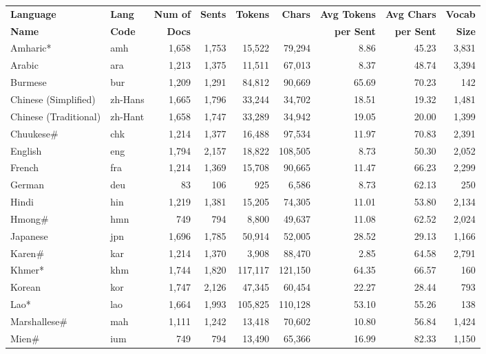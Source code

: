 \begin{table}[t]
\centering
\small
\setlength{\tabcolsep}{4pt}
\begin{tabular}{l l r r r r r r r}
\toprule
\textbf{Language} & \textbf{Lang} & \textbf{Num of} & \textbf{Sents} & \textbf{Tokens} & \textbf{Chars} & \textbf{Avg Tokens} & \textbf{Avg Chars} & \textbf{Vocab} \\
\textbf{Name} & \textbf{Code} & \textbf{Docs} &  &  &  & \textbf{per Sent} & \textbf{per Sent} & \textbf{Size} \\
\midrule
Amharic* & amh & 1,658 & 1,753 & 15,522 & 79,294 & 8.86 & 45.23 & 3,831 \\
Arabic & ara & 1,213 & 1,375 & 11,511 & 67,013 & 8.37 & 48.74 & 3,394 \\
Burmese & bur & 1,209 & 1,291 & 84,812 & 90,669 & 65.69 & 70.23 & 142 \\
Chinese (Simplified) & zh-Hans & 1,665 & 1,796 & 33,244 & 34,702 & 18.51 & 19.32 & 1,481 \\
Chinese (Traditional) & zh-Hant & 1,658 & 1,747 & 33,289 & 34,942 & 19.05 & 20.00 & 1,399 \\
Chuukese\# & chk & 1,214 & 1,377 & 16,488 & 97,534 & 11.97 & 70.83 & 2,391 \\
English & eng & 1,794 & 2,157 & 18,822 & 108,505 & 8.73 & 50.30 & 2,052 \\
French & fra & 1,214 & 1,369 & 15,708 & 90,665 & 11.47 & 66.23 & 2,299 \\
German & deu & 83 & 106 & 925 & 6,586 & 8.73 & 62.13 & 250 \\
Hindi & hin & 1,219 & 1,381 & 15,205 & 74,305 & 11.01 & 53.80 & 2,134 \\
Hmong\# & hmn & 749 & 794 & 8,800 & 49,637 & 11.08 & 62.52 & 2,024 \\
Japanese & jpn & 1,696 & 1,785 & 50,914 & 52,005 & 28.52 & 29.13 & 1,166 \\
Karen\# & kar & 1,214 & 1,370 & 3,908 & 88,470 & 2.85 & 64.58 & 2,791 \\
Khmer* & khm & 1,744 & 1,820 & 117,117 & 121,150 & 64.35 & 66.57 & 160 \\
Korean & kor & 1,747 & 2,126 & 47,345 & 60,454 & 22.27 & 28.44 & 793 \\
Lao* & lao & 1,664 & 1,993 & 105,825 & 110,128 & 53.10 & 55.26 & 138 \\
Marshallese\# & mah & 1,111 & 1,242 & 13,418 & 70,602 & 10.80 & 56.84 & 1,424 \\
Mien\# & ium & 749 & 794 & 13,490 & 65,366 & 16.99 & 82.33 & 1,150 \\

\end{tabular}
\end{table}
